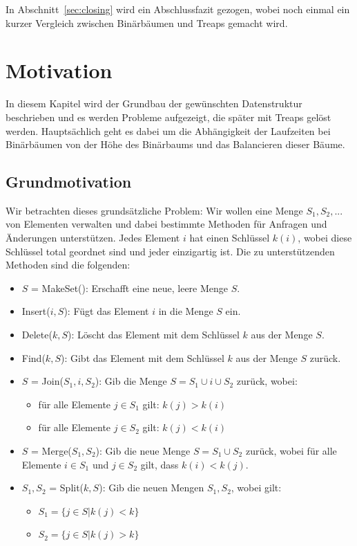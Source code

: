 \documentclass[a4paper]{scrreprt}
\theoremstyle{definition}
\begin{document}
In Abschnitt~\ref{sec:closing} wird ein Abschlussfazit gezogen, wobei noch einmal ein kurzer Vergleich zwischen Binärbäumen und Treaps gemacht wird.

\chapter{Motivation}
\label{sec:motivation}

In diesem Kapitel wird der Grundbau der gewünschten Datenstruktur beschrieben und es werden Probleme aufgezeigt, die später mit Treaps gelöst werden.
Hauptsächlich geht es dabei um die Abhängigkeit der Laufzeiten bei Binärbäumen von der Höhe des Binärbaums und das Balancieren dieser Bäume.

\section{Grundmotivation}
\label{sec:motivationbasics}

Wir betrachten dieses grundsätzliche Problem:
Wir wollen eine Menge ${S_1, S_2, ...}$ von Elementen verwalten und dabei bestimmte Methoden für Anfragen und Änderungen unterstützen.
Jedes Element $i$ hat einen Schlüssel $k(i)$, wobei diese Schlüssel total geordnet sind und jeder einzigartig ist.
Die zu unterstützenden Methoden sind die folgenden:

\begin{itemize}
\item $S$ = MakeSet(): Erschafft eine neue, leere Menge $S$.
\item Insert($i, S$): Fügt das Element $i$ in die Menge $S$ ein.
\item Delete($k, S$): Löscht das Element mit dem Schlüssel $k$ aus der Menge $S$.
\item Find($k, S$): Gibt das Element mit dem Schlüssel $k$ aus der Menge $S$ zurück.
\item $S$ = Join($S_1, i, S_2$): Gib die Menge $S = S_1 \cup {i} \cup S_2$ zurück, wobei:
	\begin{itemize}
	\item für alle Elemente $j \in S_1$ gilt: $k(j) > k(i)$
	\item für alle Elemente $j \in S_2$ gilt: $k(j) < k(i)$
	\end{itemize}
\item $S$ = Merge($S_1, S_2$): Gib die neue Menge $S = S_1 \cup S_2$ zurück, wobei für alle Elemente $i \in S_1$ und $j \in S_2$ gilt, dass $k(i) < k(j)$.
\item $S_1, S_2$ = Split($k, S$): Gib die neuen Mengen $S_1, S_2$, wobei gilt:
	\begin{itemize}
	\item $S_1 = \{j \in S | k(j) < k\}$
	\item $S_2 = \{j \in S | k(j) > k\}$
	\end{itemize}
\end{itemize}
\end{document}
